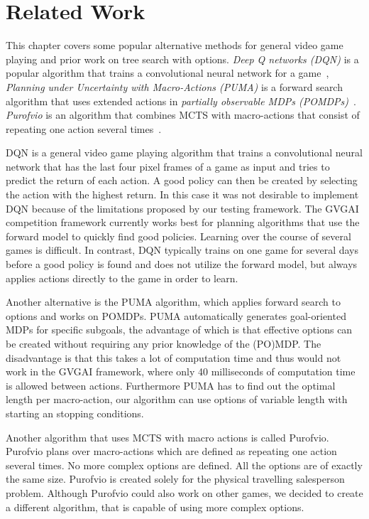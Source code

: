 \section{Related Work}
\label{sec:related}
This chapter covers some popular alternative methods for general video game
playing and prior work on tree search with options. \emph{Deep Q networks (DQN)}
is a popular algorithm that trains a convolutional neural network for a
game~\cite{mnih2013playing}, \emph{Planning under Uncertainty with Macro-Actions
(PUMA)} is a forward search algorithm that uses extended actions in
\emph{partially observable MDPs (POMDPs)}~\cite{he2010puma}. \emph{Purofvio} is
an algorithm that combines MCTS with macro-actions that consist of repeating one
action several times~\cite{powley2012monte}.

DQN is a general video game playing algorithm that trains a convolutional neural
network that has the last four pixel frames of a game as input and tries to
predict the return of each action. A good policy can then be created by
selecting the action with the highest return. In this case it was not desirable
to implement DQN because of the limitations proposed by our testing framework.
The GVGAI competition framework currently works best for planning algorithms
that use the forward model to quickly find good policies. Learning over the
course of several games is difficult. In contrast, DQN typically trains on one
game for several days before a good policy is found and does not utilize the
forward model, but always applies actions directly to the game in order to
learn.

Another alternative is the PUMA algorithm, which applies forward search to
options and works on POMDPs. PUMA automatically generates goal-oriented MDPs for
specific subgoals, the advantage of which is that effective options can be
created without requiring any prior knowledge of the (PO)MDP\@. The disadvantage
is that this takes a lot of computation time and thus would not work in the
GVGAI framework, where only 40 milliseconds of computation time is allowed
between actions. Furthermore PUMA has to find out the optimal length per
macro-action, our algorithm can use options of variable length with starting an
stopping conditions.

Another algorithm that uses MCTS with macro actions is called Purofvio.
Purofvio plans over macro-actions which are defined as repeating one action
several times. No more complex options are defined.  All the options are of
exactly the same size. Purofvio is created solely for the physical travelling
salesperson problem. Although Purofvio could also work on other games, we
decided to create a different algorithm, that is capable of using more complex
options.
